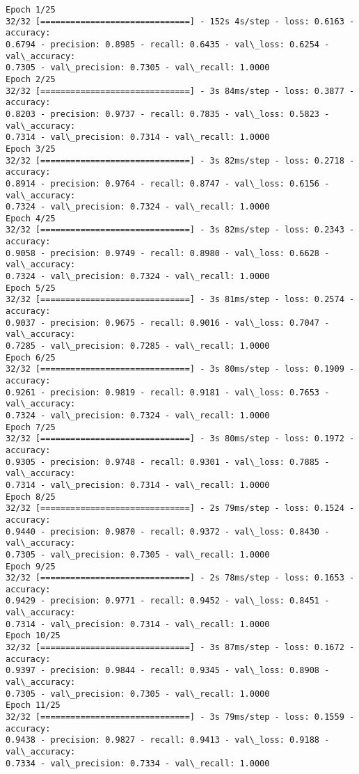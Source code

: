 \documentclass[11pt]{article}
\begin{document}
    \begin{Verbatim}[commandchars=\\\{\}]
Epoch 1/25
32/32 [==============================] - 152s 4s/step - loss: 0.6163 - accuracy:
0.6794 - precision: 0.8985 - recall: 0.6435 - val\_loss: 0.6254 - val\_accuracy:
0.7305 - val\_precision: 0.7305 - val\_recall: 1.0000
Epoch 2/25
32/32 [==============================] - 3s 84ms/step - loss: 0.3877 - accuracy:
0.8203 - precision: 0.9737 - recall: 0.7835 - val\_loss: 0.5823 - val\_accuracy:
0.7314 - val\_precision: 0.7314 - val\_recall: 1.0000
Epoch 3/25
32/32 [==============================] - 3s 82ms/step - loss: 0.2718 - accuracy:
0.8914 - precision: 0.9764 - recall: 0.8747 - val\_loss: 0.6156 - val\_accuracy:
0.7324 - val\_precision: 0.7324 - val\_recall: 1.0000
Epoch 4/25
32/32 [==============================] - 3s 82ms/step - loss: 0.2343 - accuracy:
0.9058 - precision: 0.9749 - recall: 0.8980 - val\_loss: 0.6628 - val\_accuracy:
0.7324 - val\_precision: 0.7324 - val\_recall: 1.0000
Epoch 5/25
32/32 [==============================] - 3s 81ms/step - loss: 0.2574 - accuracy:
0.9037 - precision: 0.9675 - recall: 0.9016 - val\_loss: 0.7047 - val\_accuracy:
0.7285 - val\_precision: 0.7285 - val\_recall: 1.0000
Epoch 6/25
32/32 [==============================] - 3s 80ms/step - loss: 0.1909 - accuracy:
0.9261 - precision: 0.9819 - recall: 0.9181 - val\_loss: 0.7653 - val\_accuracy:
0.7324 - val\_precision: 0.7324 - val\_recall: 1.0000
Epoch 7/25
32/32 [==============================] - 3s 80ms/step - loss: 0.1972 - accuracy:
0.9305 - precision: 0.9748 - recall: 0.9301 - val\_loss: 0.7885 - val\_accuracy:
0.7314 - val\_precision: 0.7314 - val\_recall: 1.0000
Epoch 8/25
32/32 [==============================] - 2s 79ms/step - loss: 0.1524 - accuracy:
0.9440 - precision: 0.9870 - recall: 0.9372 - val\_loss: 0.8430 - val\_accuracy:
0.7305 - val\_precision: 0.7305 - val\_recall: 1.0000
Epoch 9/25
32/32 [==============================] - 2s 78ms/step - loss: 0.1653 - accuracy:
0.9429 - precision: 0.9771 - recall: 0.9452 - val\_loss: 0.8451 - val\_accuracy:
0.7314 - val\_precision: 0.7314 - val\_recall: 1.0000
Epoch 10/25
32/32 [==============================] - 3s 87ms/step - loss: 0.1672 - accuracy:
0.9397 - precision: 0.9844 - recall: 0.9345 - val\_loss: 0.8908 - val\_accuracy:
0.7305 - val\_precision: 0.7305 - val\_recall: 1.0000
Epoch 11/25
32/32 [==============================] - 3s 79ms/step - loss: 0.1559 - accuracy:
0.9438 - precision: 0.9827 - recall: 0.9413 - val\_loss: 0.9188 - val\_accuracy:
0.7334 - val\_precision: 0.7334 - val\_recall: 1.0000

\end{Verbatim}
\end{document}
